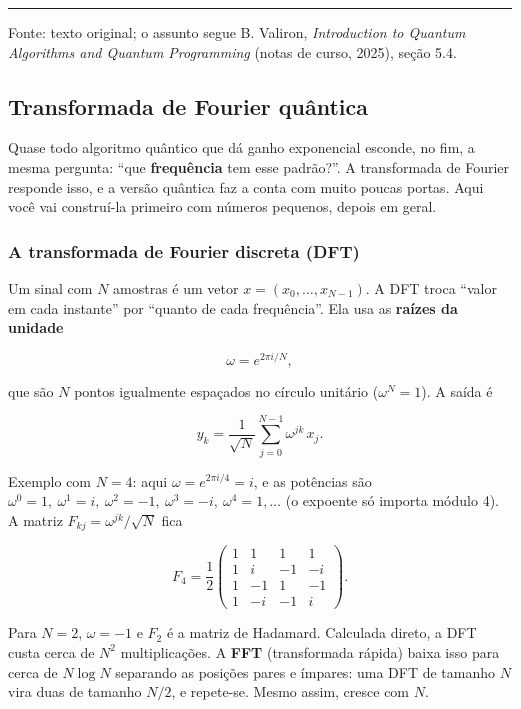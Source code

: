 \begin{center}\rule{0.5\linewidth}{0.5pt}\end{center}

Fonte: texto original; o assunto segue B. Valiron, \emph{Introduction to Quantum Algorithms and Quantum Programming} (notas de curso, 2025), seção 5.4.

\subsection{Transformada de Fourier quântica}
Quase todo algoritmo quântico que dá ganho exponencial esconde, no fim, a mesma pergunta: ``que \textbf{frequência} tem esse padrão?''. A transformada de Fourier responde isso, e a versão quântica faz a conta com muito poucas portas. Aqui você vai construí-la primeiro com números pequenos, depois em geral.

\subsubsection{A transformada de Fourier discreta (DFT)}\label{a-transformada-de-fourier-discreta-dft}

Um sinal com \(N\) amostras é um vetor \(x = (x_0,\dots,x_{N-1})\). A DFT troca ``valor em cada instante'' por ``quanto de cada frequência''. Ela usa as \textbf{raízes da unidade}

\[
\omega = e^{2\pi i/N},
\]

que são \(N\) pontos igualmente espaçados no círculo unitário (\(\omega^N = 1\)). A saída é

\[
y_k = \frac{1}{\sqrt N}\sum_{j=0}^{N-1} \omega^{jk}\, x_j .
\]

Exemplo com \(N=4\): aqui \(\omega = e^{2\pi i/4} = i\), e as potências são \(\omega^0=1,\ \omega^1=i,\ \omega^2=-1,\ \omega^3=-i,\ \omega^4=1,\dots\) (o expoente só importa módulo 4). A matriz \(F_{kj}=\omega^{jk}/\sqrt N\) fica

\[
F_4 = \frac12\begin{pmatrix} 1&1&1&1\\ 1&i&-1&-i\\ 1&-1&1&-1\\ 1&-i&-1&i \end{pmatrix}.
\]

Para \(N=2\), \(\omega=-1\) e \(F_2\) é a matriz de Hadamard. Calculada direto, a DFT custa cerca de \(N^2\) multiplicações. A \textbf{FFT} (transformada rápida) baixa isso para cerca de \(N\log N\) separando as posições pares e ímpares: uma DFT de tamanho \(N\) vira duas de tamanho \(N/2\), e repete-se. Mesmo assim, cresce com \(N\).

